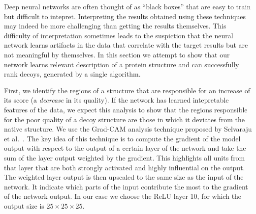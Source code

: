 Deep neural networks are often thought of as ``black boxes'' that are
easy to train but difficult to intepret. Interpreting the results
obtained using these techniques may indeed be more challenging than
getting the results themselves. This difficulty of interpretation
sometimes leads to the suspiction that the neural network learns
artifacts in the data that correlate with the target results but are
not meaningful by themselves.
%
In this section we attempt to show that our network learns relevant
description of a protein structure and can successfully rank decoys, 
generated by a single algorithm.

First, we identify the regions of a structure that are responsible for
an increase of its score (a \emph{decrease} in its quality). If the
network has learned intepretable features of the data, we expect this
analysis to show that the regions responsible for the poor quality of
a decoy structure are those in which it deviates from the native
structure.
%
We use the Grad-CAM analysis technique proposed by Selvaraju et
al.~\cite{selvaraju2016grad}. The key idea of this technique is to
compute the gradient of the model output with respect to the output of a certain layer of the network
and take the sum of the layer output weighted by the gradient.
%
%
This highlights all units from that layer that are both strongly
activated and highly influential on the output.
%
The weighted layer output is then upscaled to the same size as the input of the network. 
It indicate which parts of the input contribute the most to the gradient of the network output.
%
In our case we choose the ReLU layer 10, for which
the output size is $25\times 25\times 25$.

